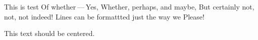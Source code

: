 This is test
Of whether — Yes,
Whether, perhaps, and maybe,
But certainly not,
not, not indeed!
Lines can be formattted just the way we
Please!


\begin{center}
This text should be centered.

\end{center}
